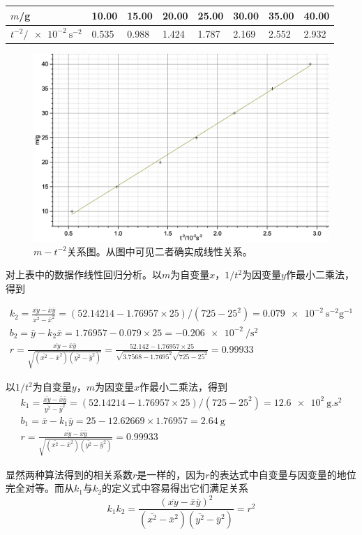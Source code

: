 \documentclass[UTF8]{ctexart}
\begin{document}
\subsection{}
\noindent
\begin{tabu} to \linewidth {X[2]|X X X X X X X}
\hline
$m$/g&10.00&15.00&20.00&25.00&30.00&35.00&40.00\\
\hline
$t^{-2}/\SI{e-2}{\second^{-2}}$&0.535 &0.988 &1.424 &1.787 &2.169 &2.552 &2.932\\
\hline
\end{tabu}
\begin{figure}[h]
  \includegraphics[width=\linewidth,keepaspectratio=true]{m-t.eps}
  \caption{$m-t^{-2}$关系图。从图中可见二者确实成线性关系。}
\end{figure}

对上表中的数据作线性回归分析。以$m$为自变量$x$，$1/t^2$为因变量$y$作最小二乘法，得到

\begin{gather}
  k_2= \frac{\overline{xy}-\bar{x}\bar{y}}{\bar{x^2}-\bar{x}^2}=(52.14214-1.76957\times25)/(725-25^2)=\SI{0.079e-2}{\second^{-2}\gram^{-1}}\\
  b_2= \bar{y}-k_2\bar{x}=1.76957-0.079\times25=\SI{-0.206e-2}{\per\second\squared}\\
  r=\frac{\overline{xy}-\bar{x}\bar{y}}{\sqrt{(\bar{x^2}-\bar{x}^2)(\bar{y^2}-\bar{y}^2)}}=\frac{52.142-1.76957\times25}{\sqrt{3.7568-1.7695^2}\sqrt{725-25^2}}=0.99933
\end{gather}

以$1/t^2$为自变量$y$，$m$为因变量$x$作最小二乘法，得到
\begin{gather}
  k_1= \frac{\overline{xy}-\bar{x}\bar{y}}{\bar{y^2}-\bar{y}^2}=(52.14214-1.76957\times25)/(725-25^2)=\SI{12.6e2}{\gram.\second^2}\\
  b_1= \bar{x}-k_1\bar{y}=25-12.62669\times1.76957=\SI{2.64}{\gram}\\
  r=\frac{\overline{xy}-\bar{x}\bar{y}}{\sqrt{(\bar{x^2}-\bar{x}^2)(\bar{y^2}-\bar{y}^2)}}=0.99933
\end{gather}

显然两种算法得到的相关系数$r$是一样的，因为$r$的表达式中自变量与因变量的地位完全对等。而从$k_1$与$k_2$的定义式中容易得出它们满足关系
\begin{equation}
k_1k_2=\frac{(\overline{xy}-\bar{x}\bar{y})^2} {(\bar{x^2}-\bar{x}^2)(\bar{y^2}-\bar{y}^2)}=r^2
\end{equation}
\end{document}
